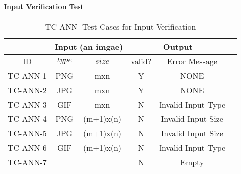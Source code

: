 \documentclass[12pt, titlepage]{article}
\begin{document}
\paragraph{Input Verification Test} 
\begin{center}
  \begin{table}[h]
  \resizebox{\textwidth}{!}
  { %
      \begin{tabular}{ lccccc }
      \hline
      \multicolumn{1}{l|}{}   & \multicolumn{2}{c|}{Input (an imgae) }                            & \multicolumn{2}{c}{Output} \\ 
      
      \hline
      
      \multicolumn{1}{c|}{ID} &   $type$   &   \multicolumn{1}{c|}{$size$}   &   valid?   &   Error Message \\ \hline
      
      TC-ANN-1   &   PNG  & mxn        &  Y  & NONE               \\
      TC-ANN-2   &   JPG  & mxn        &  Y  & NONE               \\
      TC-ANN-3   &   GIF  & mxn        &  N  & Invalid Input Type  \\ 
      TC-ANN-4   &   PNG  & (m+1)x(n)  &  N  & Invalid Input Size   \\
      TC-ANN-5   &   JPG  & (m+1)x(n)  &  N  & Invalid Input Size    \\
      TC-ANN-6   &   GIF  & (m+1)x(n)  &  N  & Invalid Input Type \\
      TC-ANN-7   &        &            &  N  & Empty      \\
      \hline
      
      
      \end{tabular} %
  }
  \caption{TC-ANN- Test Cases for Input Verification}
  \label{TCInput}
  \end{table}
  \end{center}
\end{document}
